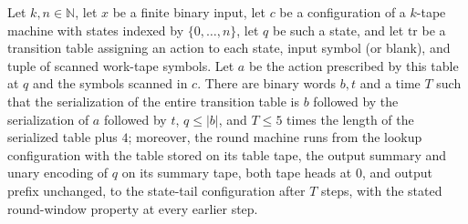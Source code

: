 \begin{lemma}
\label{Turing.StepBlock.roundTM_lookup}
\leanok
{}
Let $k,n\in\mathbb{N}$, let $x$ be a finite binary input, let $c$ be a configuration of
a $k$-tape machine with states indexed by $\{0,\ldots,n\}$, let $q$ be such a state, and
let $\mathrm{tr}$ be a transition table assigning an action to each state, input symbol
(or blank), and tuple of scanned work-tape symbols. Let $a$ be the action prescribed by
this table at $q$ and the symbols scanned in $c$. There are binary words $b,t$ and a
time $T$ such that the serialization of the entire transition table is $b$ followed by
the serialization of $a$ followed by $t$, $q\le |b|$, and $T\le 5$ times the length of
the serialized table plus $4$; moreover, the round machine runs from the lookup
configuration with the table stored on its table tape, the output summary and unary
encoding of $q$ on its summary tape, both tape heads at $0$, and output prefix
unchanged, to the state-tail configuration after $T$ steps, with the stated round-window
property at every earlier step.
\end{lemma}

